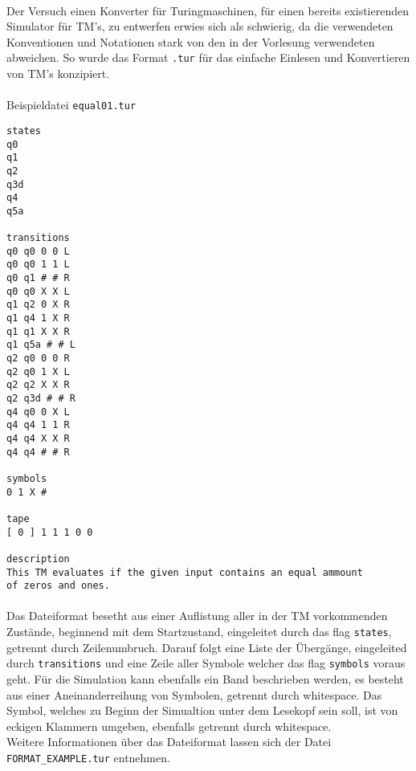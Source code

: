 \documentclass[10pt, a4paper]{article}
\newcommand{\ilc}{\texttt}
\begin{document}
\paragraph*{}
Der Versuch einen Konverter für Turingmaschinen, für einen bereits existierenden Simulator für TM's, zu entwerfen erwies sich als schwierig, da die verwendeten Konventionen und Notationen stark von den in der Vorlesung verwendeten abweichen. So wurde das Format \ilc{.tur} für das einfache Einlesen und Konvertieren von TM's konzipiert.\par

\paragraph*{}
\begin{center}
Beispieldatei \texttt{equal01.tur}
\end{center}
\begin{tiny}
\begin{tcolorbox}
\begin{verbatim}
states
q0
q1
q2
q3d
q4
q5a

transitions
q0 q0 0 0 L
q0 q0 1 1 L
q0 q1 # # R
q0 q0 X X L
q1 q2 0 X R
q1 q4 1 X R
q1 q1 X X R
q1 q5a # # L
q2 q0 0 0 R
q2 q0 1 X L
q2 q2 X X R
q2 q3d # # R
q4 q0 0 X L
q4 q4 1 1 R
q4 q4 X X R
q4 q4 # # R

symbols
0 1 X #

tape
[ 0 ] 1 1 1 0 0

description
This TM evaluates if the given input contains an equal ammount
of zeros and ones. 
\end{verbatim}
\end{tcolorbox}
\end{tiny}
\par

\paragraph*{}
Das Dateiformat besetht aus einer Auflistung aller in der TM vorkommenden Zustände, beginnend mit dem Startzustand, eingeleitet durch das flag \ilc{states}, getrennt durch Zeilenumbruch. Darauf folgt eine Liste der Übergänge, eingeleited durch \ilc{transitions} und eine Zeile aller Symbole welcher das flag \ilc{symbols} voraus geht. Für die Simulation kann ebenfalls ein Band beschrieben werden, es besteht aus einer Aneinanderreihung von Symbolen, getrennt durch whitespace. Das Symbol, welches zu Beginn der Simualtion unter dem Lesekopf sein soll, ist von eckigen Klammern umgeben, ebenfalls getrennt durch whitespace.\\
Weitere Informationen über das Dateiformat lassen sich der Datei \ilc{FORMAT\_EXAMPLE.tur} entnehmen.\par
\end{document}
